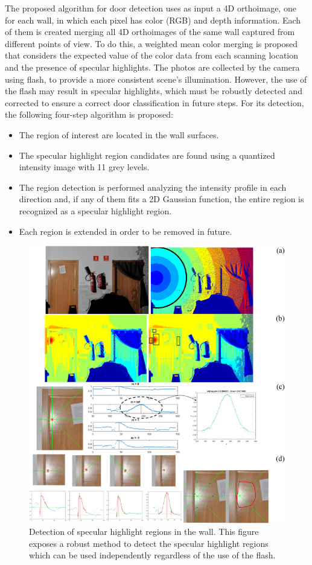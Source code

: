 The proposed algorithm for door detection uses as input a 4D orthoimage, one for each wall, in which each pixel has color (RGB) and depth information. Each of them is created merging all 4D orthoimages of the same wall captured from different points of view. To do this, a weighted mean color merging is proposed that considers the expected value of
the color data from each scanning location and the presence of specular highlights. The photos are collected by the camera using flash, to provide a more consistent scene's illumination. However, the use of the flash may result in specular highlights, which  must be robustly detected and corrected to ensure a correct door classification in future steps. For its detection, the following four-step algorithm is proposed:
\begin{itemize}
	\item The region of interest are located in the wall surfaces.
	\item The specular highlight region candidates are found using a quantized intensity image with 11 grey levels.
	\item The region detection is performed analyzing the intensity profile in each direction and, if any of them fits a 2D Gaussian
	function, the entire region is recognized as a specular highlight region.
	\item Each region is extended in order to be removed in future. 
\end{itemize}

\begin{figure}[h!]
	\centering
	\includegraphics[width=0.78\linewidth]{images/specularregion.jpg}
	\caption{Detection of specular highlight regions in the wall. This figure exposes a robust method to detect the specular highlight regions which can be used independently regardless of the use of the flash.}
\end{figure}

